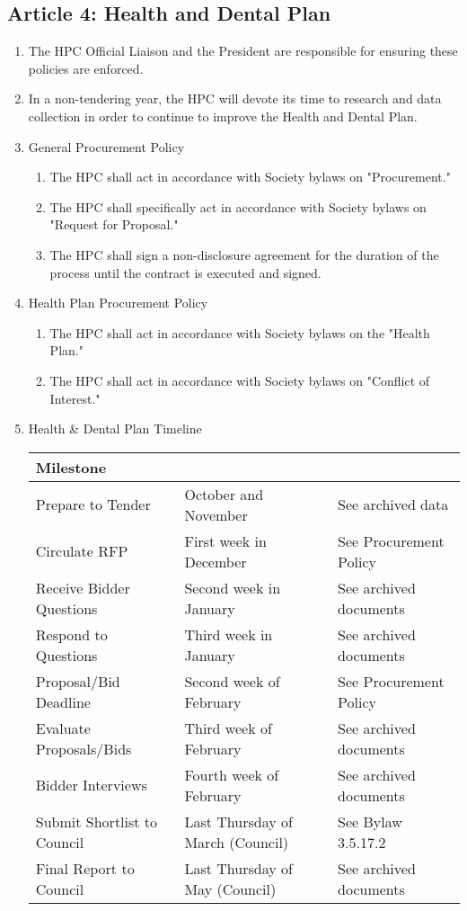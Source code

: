 \subsection{Article 4: Health and Dental Plan}
\begin{enumerate} [label*=\arabic*., align=left]	
\item The HPC Official Liaison and the President are responsible for ensuring these policies are enforced.
\item In a non-tendering year, the HPC will devote its time to research and data collection in order to continue to improve the Health and Dental Plan.
\item General Procurement Policy
\begin{enumerate}[label*=\arabic*., align=left]	
\item The HPC shall act in accordance with Society bylaws on "Procurement."
\item The HPC shall specifically act in accordance with Society bylaws on "Request for Proposal."
\item The HPC shall sign a non-disclosure agreement for the duration of the process until the
contract is executed and signed.
\end{enumerate}
\item Health Plan Procurement Policy
\begin{enumerate} [label*=\arabic*., align=left]	
\item The HPC shall act in accordance with Society bylaws on the "Health Plan."
\item The HPC shall act in accordance with Society bylaws on "Conflict of Interest."
\end{enumerate}
\item Health \& Dental Plan Timeline

\begin{tabular}{|l|l|l|}
\hline 
\multicolumn{3}{|l|}{\textbf{Milestone}} \\ 
\hline 
Prepare to Tender & October and November & See archived data \\ 
\hline 
Circulate RFP & First week in December & See Procurement Policy \\ 
\hline 
Receive Bidder Questions & Second week in January & See archived documents \\ 
\hline 
Respond to Questions & Third week in January & See archived documents \\ 
\hline 
Proposal/Bid Deadline & Second week of February & See Procurement Policy \\ 
\hline 
Evaluate Proposals/Bids & Third week of February & See archived documents \\ 
\hline 
Bidder Interviews & Fourth week of February & See archived documents \\ 
\hline 
Submit Shortlist to Council & Last Thursday of  March (Council) & See Bylaw 3.5.17.2 \\ 
\hline 
Final Report to Council & Last Thursday of \newline May (Council) & See archived documents \\ 
\hline 
\end{tabular} 


\end{enumerate}

